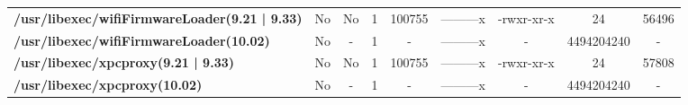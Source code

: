 \begin{center}
{\begin{tabular}{|>{\bfseries} l | C | C | C | C | C | C | C | C |}
					/usr/libexec/wifiFirmwareLoader(9.21 | 9.33) & No & No & \color{green}1 & \color{red}100755 & \color{green}---------x & \color{red}-rwxr-xr-x & \color{green}24 & \color{red}56496\\ 
					/usr/libexec/wifiFirmwareLoader(10.02) & No & - & 1 & - & ---------x & - & 4494204240 & -\\ 
					/usr/libexec/xpcproxy(9.21 | 9.33) & No & No & \color{green}1 & \color{red}100755 & \color{green}---------x & \color{red}-rwxr-xr-x & \color{green}24 & \color{red}57808\\ 
					/usr/libexec/xpcproxy(10.02) & No & - & 1 & - & ---------x & - & 4494204240 & -\\ 

			\end{tabular}
		}
	\end{center}




